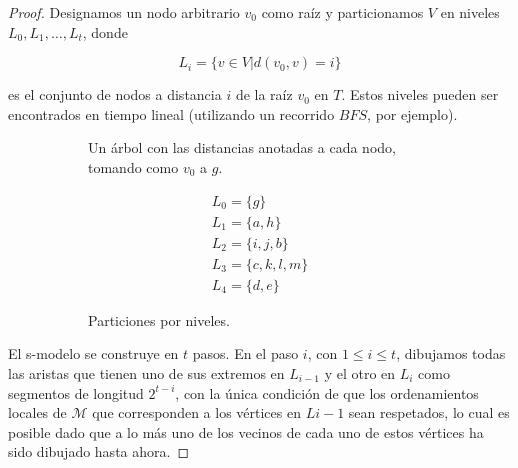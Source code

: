 \begin{proof}
  Designamos un nodo arbitrario $v_0$ como raíz y particionamos $V$ en niveles $L_0, L_1, \dots, L_t$, donde

  \begin{equation*}
    L_i = \{v\in V | d(v_0,v) = i\}
  \end{equation*}

  es el conjunto de nodos a distancia $i$ de la raíz $v_0$ en $T$. Estos niveles pueden ser encontrados en tiempo lineal (utilizando un recorrido $BFS$, por ejemplo).

\begin{figure}
    \begin{subfigure}{0.4\textwidth}
      \caption{Un árbol con las distancias anotadas a cada nodo, tomando como $v_0$ a $g$.}
    \end{subfigure}
    \begin{subfigure}{0.4\textwidth}
        \begin{equation*}
          \begin{split}
            L_0 = \{g\} \\
            L_1 = \{a, h\} \\
            L_2 = \{i, j, b\} \\
            L_3 = \{c, k, l, m\} \\
            L_4 = \{d, e\}
          \end{split}
        \end{equation*}
        \caption{Particiones por niveles.}
    \end{subfigure}
    \caption{}
\end{figure}

  El s-modelo se construye en $t$ pasos. En el paso $i$, con $1 \leq i \leq t$, dibujamos todas las aristas que tienen uno de sus extremos en $L_{i-1}$ y el otro en $L_i$ como segmentos de longitud $2^{t-i}$, con la única condición de que los ordenamientos locales de $\mathcal{M}$ que corresponden a los vértices en $L{i-1}$ sean respetados, lo cual es posible dado que a lo más uno de los vecinos de cada uno de estos vértices ha sido dibujado hasta ahora.
\end{proof}